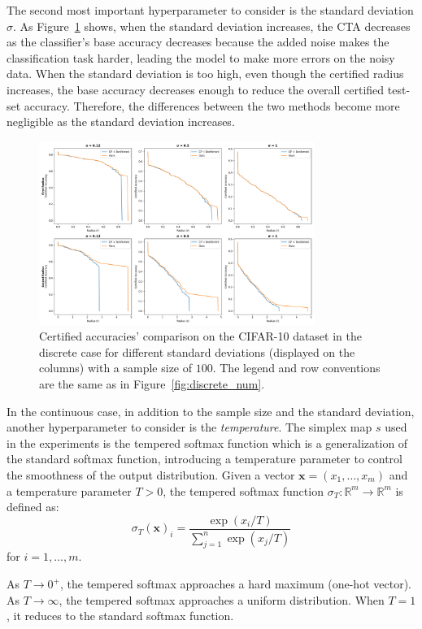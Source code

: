 The second most important hyperparameter to consider is the standard deviation $\sigma$.
As Figure~\ref{fig:discrete_sigma} shows, when the standard deviation increases, the CTA decreases as the classifier’s base accuracy decreases because the added noise makes the classification task harder, leading the model to make more errors on the noisy data.
When the standard deviation is too high, even though the certified radius increases, the base accuracy decreases enough to reduce the overall certified test-set accuracy.
Therefore, the differences between the two methods become more negligible as the standard deviation increases.

\begin{figure}[htbp]
    \centering
    \includegraphics[width=0.8\textwidth]{images/discrete_sigma}
    \caption{Certified accuracies' comparison on the CIFAR-10 dataset in the discrete case for different standard deviations (displayed on the columns) with a sample size of $100$. The legend and row conventions are the same as in Figure~\ref{fig:discrete_num}.}
    \label{fig:discrete_sigma}
\end{figure}

In the continuous case, in addition to the sample size and the standard deviation, another hyperparameter to consider is the \textit{temperature}.
The simplex map $s$ used in the experiments is the tempered softmax function which is a generalization of the standard softmax function, introducing a temperature parameter to control the smoothness of the output distribution.
Given a vector $\mathbf{x} = (x_1, \ldots, x_m)$ and a temperature parameter $T > 0$, the tempered softmax function $\sigma_T: \mathbb{R}^m \to \mathbb{R}^m$ is defined as:
\[
    \sigma_T(\mathbf{x})_i = \frac{\exp(x_i/T)}{\sum_{j=1}^n \exp(x_j/T)}
\]
for $i = 1, \ldots, m$.

As $T \to 0^+$, the tempered softmax approaches a hard maximum (one-hot vector).
As $T \to \infty$, the tempered softmax approaches a uniform distribution.
When $T = 1$, it reduces to the standard softmax function.

